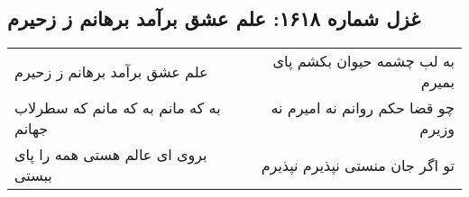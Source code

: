 \begin{center}
\section*{غزل شماره ۱۶۱۸: علم عشق برآمد برهانم ز زحیرم}
\label{sec:1618}
\begin{longtable}{l p{0.5cm} r}
علم عشق برآمد برهانم ز زحیرم
&&
به لب چشمه حیوان بکشم پای بمیرم
\\
به که مانم به که مانم که سطرلاب جهانم
&&
چو قضا حکم روانم نه امیرم نه وزیرم
\\
بروی ای عالم هستی همه را پای ببستی
&&
تو اگر جان منستی نپذیرم نپذیرم
\\
\end{longtable}
\end{center}
